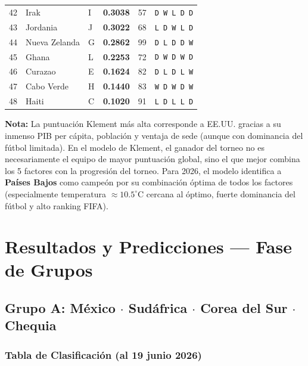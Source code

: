 \documentclass[11pt,a4paper]{article}
\begin{document}
\begin{center}
\begin{longtable}{@{}rllccc@{}}
  \rowcolor{tablerow}42 & Irak & I & \textbf{0.3038} & 57 & \texttt{D W L D D} \\
  43 & Jordania & J & \textbf{0.3022} & 68 & \texttt{L D W L D} \\
  \rowcolor{tablerow}44 & Nueva Zelanda & G & \textbf{0.2862} & 99 & \texttt{D L D D W} \\
  45 & Ghana & L & \textbf{0.2253} & 72 & \texttt{D W D W D} \\
  \rowcolor{tablerow}46 & Curazao & E & \textbf{0.1624} & 82 & \texttt{D L D L W} \\
  47 & Cabo Verde & H & \textbf{0.1440} & 83 & \texttt{W D W D W} \\
  \rowcolor{tablerow}48 & Haiti & C & \textbf{0.1020} & 91 & \texttt{L D L L D} \\

\bottomrule
\end{longtable}
\end{center}

\begin{resaltado}
\small\textbf{Nota:} La puntuación Klement más alta corresponde a EE.UU. gracias a su inmenso 
PIB per cápita, población y ventaja de sede (aunque con dominancia del fútbol limitada). En el 
modelo de Klement, el ganador del torneo no es necesariamente el equipo de mayor puntuación global, 
sino el que mejor combina los 5 factores con la progresión del torneo. Para 2026, el modelo 
identifica a \textbf{Países Bajos} como campeón por su combinación óptima de todos los factores 
(especialmente temperatura $\approx 10.5^\circ$C cercana al óptimo, fuerte dominancia del fútbol y 
alto ranking FIFA).
\end{resaltado}

\newpage

\section{Resultados y Predicciones — Fase de Grupos}

\subsection{Grupo A: México $\cdot$ Sudáfrica $\cdot$ Corea del Sur $\cdot$ Chequia}

\subsubsection*{Tabla de Clasificación (al 19 junio 2026)}
\end{document}
